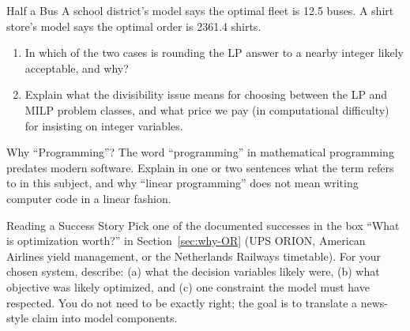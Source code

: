 
\begin{ex}{Half a Bus}{}
 A school district's model says the optimal fleet is 12.5 buses.  A shirt store's model says the optimal order is 2361.4 shirts.
\begin{enumerate}
\item In which of the two cases is rounding the LP answer to a nearby integer likely acceptable, and why?
\item Explain what the divisibility issue means for choosing between the LP and MILP problem classes, and what price we pay (in computational difficulty) for insisting on integer variables.
\end{enumerate}
\exrefs{\S\ref{sec:types-of-optimization}, \S\ref{sec:intro-MILP}}
\end{ex}

\begin{ex}{Why ``Programming''?}{}
\label{ex:programming-term}
 The word ``programming'' in mathematical programming predates modern software.  Explain in one or two sentences what the term refers to in this subject, and why ``linear programming'' does not mean writing computer code in a linear fashion.
\exrefs{\S\ref{sec:what-is-MP}}
\end{ex}

\begin{ex}{Reading a Success Story}{}
 Pick one of the documented successes in the box ``What is optimization worth?'' in Section~\ref{sec:why-OR} (UPS ORION, American Airlines yield management, or the Netherlands Railways timetable).  For your chosen system, describe: (a) what the decision variables likely were, (b) what objective was likely optimized, and (c) one constraint the model must have respected.  You do not need to be exactly right; the goal is to translate a news-style claim into model components.
\exrefs{\S\ref{sec:why-OR}, \S\ref{sec:what-is-MP}}
\end{ex}


